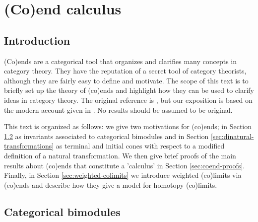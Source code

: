 \chapter{(Co)end calculus}
\section{Introduction}
(Co)ends are a categorical tool that organizes and clarifies many concepts in category theory. They have the reputation of a secret tool of category theorists, although they are fairly easy to define and motivate. The scope of this text is to briefly set up the theory of (co)ends and highlight how they can be used to clarify ideas in category theory. The original reference is \cite{Yoneda60}, but our exposition is based on the modern account given in \cite{Loregian21}. No results should be assumed to be original.

This text is organized as follows: we give two motivations for (co)ends; in Section \ref{sec:categorical-bimodule} as invariants associated to categorical bimodules and in Section \ref{sec:dinatural-transformations} as terminal and initial cones with respect to a modified definition of a natural transformation. We then give brief proofs of the main results about (co)ends that constitute a 'calculus' in Section \ref{sec:coend-proofs}. Finally, in Section \ref{sec:weighted-colimits} we introduce weighted (co)limits via (co)ends and describe how they give a model for homotopy (co)limits.

\section{Categorical bimodules}\label{sec:categorical-bimodule}

